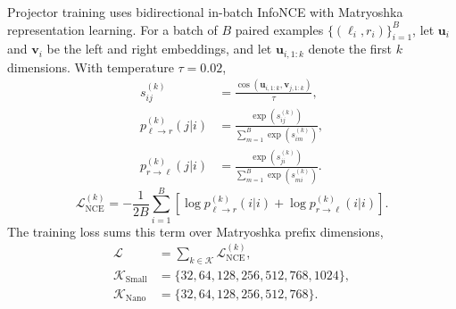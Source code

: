 \label{sec:training:loss}

Projector training uses bidirectional in-batch InfoNCE with Matryoshka representation learning.
For a batch of $B$ paired examples $\{(\ell_i,r_i)\}_{i=1}^{B}$, let $\mathbf{u}_i$ and $\mathbf{v}_i$ be the left and right embeddings, and let $\mathbf{u}_{i,1:k}$ denote the first $k$ dimensions.
With temperature $\tau=0.02$,
\begin{equation*}
\begin{aligned}
s_{ij}^{(k)}&=\frac{\cos(\mathbf{u}_{i,1:k},\mathbf{v}_{j,1:k})}{\tau},\\
p_{\ell\to r}^{(k)}(j|i)&=\frac{\exp(s_{ij}^{(k)})}{\sum_{m=1}^{B}\exp(s_{im}^{(k)})},\\
p_{r\to \ell}^{(k)}(j|i)&=\frac{\exp(s_{ji}^{(k)})}{\sum_{m=1}^{B}\exp(s_{mi}^{(k)})}.
\end{aligned}
\end{equation*}
\begin{equation*}
\mathcal{L}_{\mathrm{NCE}}^{(k)}=-\frac{1}{2B}\sum_{i=1}^{B}\left[\log p_{\ell\to r}^{(k)}(i|i)+\log p_{r\to \ell}^{(k)}(i|i)\right].
\label{eq:infonce}
\end{equation*}
The training loss sums this term over Matryoshka prefix dimensions,
\begin{equation*}
\begin{aligned}
\mathcal{L}&=\sum_{k\in\mathcal{K}}\mathcal{L}_{\mathrm{NCE}}^{(k)},\\
\mathcal{K}_{\mathrm{Small}}&=\{32,64,128,256,512,768,1024\},\\
\mathcal{K}_{\mathrm{Nano}}&=\{32,64,128,256,512,768\}.
\end{aligned}
\label{eq:matryoshka_loss}
\end{equation*}

